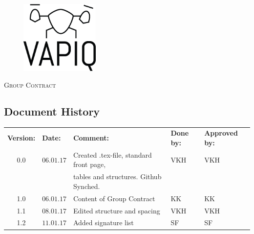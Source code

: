 \documentclass{article}
\author{Tomas Lyngroth \\ Aleksander Holthe \\ Vanja Katinka Halvorsen \\ Stian Fredriksen \\ Kent Kjeldaas \\ Katrine Sundal Haune}
\makeatletter
\let\vapiqteam\@author
\makeatother
\begin{document}
\begin{titlepage}
    \centering
    \pagecolor{gainsboro}
	\\[3.0 cm]
    \begin{figure}[h]
        \centering
        \includegraphics[width = 0.35\textwidth]{VAPIQ-PICTURES//Logo2_Tilted.png}
    \\[2.0 cm]
    \end{figure}                        
    \textsc{\Huge Group Contract}       
    \\[4.0 cm]
	\large \vapiqteam      
\end{titlepage}
\pagecolor{white}


\newpage
\begin{center}
\vspace*{1 cm}
\section*{\textbf{Document History}}
\begin{tabular}{cllll}
\rowcolor{cadetgrey}
\textbf{Version:}    &\textbf{Date:} 	 &\textbf{Comment:}    &\textbf{Done by:}   &\textbf{Approved by:}  \\

0.0       & $06.01.17$   & Created .tex-file, standard front page, & VKH  & VKH \\
          &              & tables and structures. Github Synched.    &     & \\\rowcolor{gainsboro}
1.0       & $06.01.17$   & Content of Group Contract  & KK    & KK          \\
1.1       & $08.01.17$   & Edited structure and spacing & VKH    & VKH          \\ \rowcolor{gainsboro}
1.2       & $11.01.17$   & Added signature list  & SF    & SF          \\
\end{tabular}                                                                   
\end{center}
\end{document}
